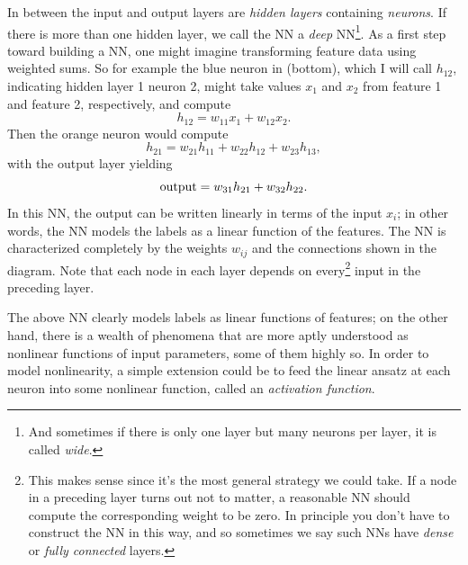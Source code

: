 In between the input and output layers are 
{\it hidden layers} containing {\it neurons}.
If there is more than one hidden layer, we call the NN a {\it deep}
NN\footnote{And sometimes if there is only one
layer but many neurons per layer, it is called {\it wide}.}.
As a first step toward building a NN, one might imagine transforming
feature data using weighted sums. So for example 
the blue neuron in  (bottom), which I will
call $h_{12}$, indicating hidden layer 1 neuron 2, might take values
$x_1$ and $x_2$ from feature 1 and feature 2, respectively, and compute
\begin{equation}
h_{12} = w_{11}x_1+w_{12}x_2.
\end{equation}
Then the orange neuron would compute
\begin{equation}
h_{21} = w_{21}h_{11}+w_{22}h_{12}+w_{23}h_{13},
\end{equation}
with the output layer yielding
\begin{equation}
{\rm output} = w_{31}h_{21}+w_{32}h_{22}.
\end{equation}
In this NN, the output can be written linearly in terms of the input $x_i$;
in other words, the NN models the labels as a linear function of the features.
The NN is characterized completely by the weights $w_{ij}$ and the connections
shown in the diagram. Note that each node in each layer depends on
every\footnote{This makes sense since it's the most
general strategy we could take. If a node in a preceding layer turns out
not to matter, a reasonable NN should compute the corresponding weight to be
zero. In principle you don't have to construct the NN in this way, and
so sometimes we say such NNs have {\it dense} or {\it fully connected}
layers.} input in the preceding layer.

The above NN clearly models labels as linear functions of features; on the other
hand, there is a wealth of phenomena that are more aptly understood as nonlinear
functions of input parameters, some of them highly so. In order to model
nonlinearity, a simple extension could be to feed the linear ansatz at each
neuron into some nonlinear function, called an {\it activation
function}.  

